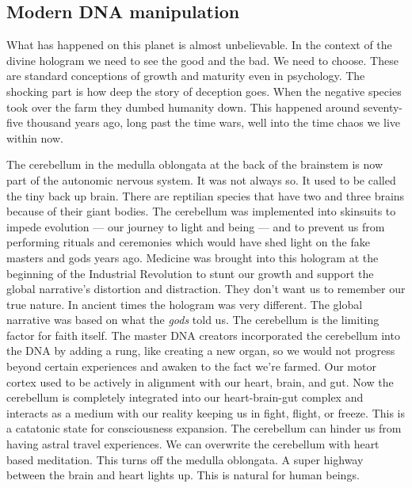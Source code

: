 \subsection{Modern DNA manipulation}\label{modern-dna-manipulation}

What has happened on this planet is almost unbelievable. In the context
of the divine hologram we need to see the good and the bad. We need to
choose. These are standard conceptions of growth and maturity even in
psychology. The shocking part is how deep the story of deception goes.
When the negative species took over the farm they dumbed humanity down.
This happened around seventy-five thousand years ago, long past the time
wars, well into the time chaos we live within now.

The cerebellum in the medulla oblongata at the back of the brainstem is
now part of the autonomic nervous system. It was not always so. It used
to be called the tiny back up brain. There are reptilian species that
have two and three brains because of their giant bodies. The cerebellum
was implemented into skinsuits to impede evolution --- our journey to
light and being --- and to prevent us from performing rituals and
ceremonies which would have shed light on the fake masters and gods
years ago. Medicine was brought into this hologram at the beginning of
the Industrial Revolution to stunt our growth and support the global
narrative's distortion and distraction. They don't want us to remember
our true nature. In ancient times the hologram was very different. The
global narrative was based on what the \emph{gods} told us. The
cerebellum is the limiting factor for faith itself. The master DNA
creators incorporated the cerebellum into the DNA by adding a rung, like
creating a new organ, so we would not progress beyond certain
experiences and awaken to the fact we're farmed. Our motor cortex used
to be actively in alignment with our heart, brain, and gut. Now the
cerebellum is completely integrated into our heart-brain-gut complex and
interacts as a medium with our reality keeping us in fight, flight, or
freeze. This is a catatonic state for consciousness expansion. The
cerebellum can hinder us from having astral travel experiences. We can
overwrite the cerebellum with heart based meditation. This turns off the
medulla oblongata. A super highway between the brain and heart lights
up. This is natural for human beings.

